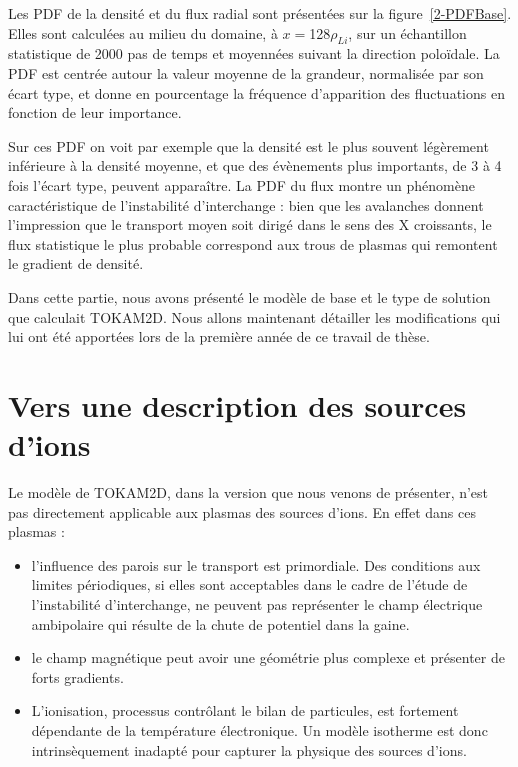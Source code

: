 \begin{refsection}
 Les PDF
de la densité et du flux radial sont présentées sur la figure~\ref{2-PDFBase}. Elles
sont calculées au milieu du domaine, à $x=$128$\rho_{Li}$, sur un
échantillon statistique de 2000 pas de temps et moyennées suivant la direction
poloïdale. La PDF est centrée autour la valeur moyenne de la grandeur,
normalisée par son écart type, et donne en pourcentage la fréquence d'apparition
des fluctuations en fonction de leur importance.


Sur ces PDF on voit par exemple que la densité est le plus souvent
légèrement inférieure à la densité moyenne, et que des évènements plus
importants, de 3 à 4 fois l'écart type, peuvent apparaître. La PDF du flux
montre un phénomène caractéristique de l'instabilité d'interchange : bien que
les avalanches donnent l'impression que le transport moyen soit dirigé dans
le sens des X croissants, le flux statistique le plus probable correspond aux
trous de plasmas qui remontent le gradient de densité.

Dans cette partie, nous avons présenté le modèle de base et le type
de solution que calculait TOKAM2D. Nous allons maintenant détailler les
modifications qui lui ont été apportées lors de la première année de ce travail
de thèse.

\section{Vers une description des sources d'ions}

Le modèle de TOKAM2D, dans la version que nous venons de présenter, n'est pas
directement applicable aux plasmas des sources d'ions. En effet dans
ces plasmas :

\begin{itemize}
	\item l'influence des parois sur le transport est primordiale. Des conditions
	aux limites périodiques, si elles sont acceptables dans le cadre de l'étude de
	l'instabilité d'interchange, ne peuvent pas représenter le champ électrique
	ambipolaire qui résulte de la chute de potentiel dans la gaine.
	\item le champ magnétique peut avoir une géométrie plus complexe et présenter
	de forts gradients.
	\item L'ionisation, processus contrôlant le bilan de particules, est fortement
	dépendante de la température électronique. Un modèle isotherme est donc
	intrinsèquement inadapté pour capturer la physique des sources d'ions.
\end{itemize}


\end{refsection}
